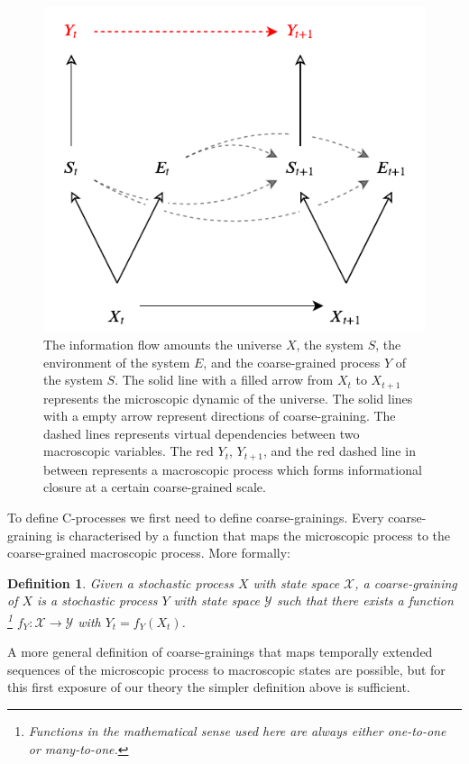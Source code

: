 \documentclass[utf8]{article}
\newtheorem{definition}{Definition}
\begin{document}
        
		\begin{figure}[H]
		    \centering
			\includegraphics[width=\textwidth]{WritingMaterials/Fig_FullGraph/FullGraph.pdf}
			\caption{The information flow amounts the universe $X$, the system $S$, the environment of the system $E$, and the coarse-grained process $Y$ of the system $S$. The solid line with a filled arrow from $X_t$ to $X_{t+1}$ represents the microscopic dynamic of the universe. The solid lines with a empty arrow represent directions of coarse-graining. The dashed lines represents virtual dependencies between  two macroscopic variables. The red $Y_t$, $Y_{t+1}$, and the red dashed line in between represents a macroscopic process which forms informational closure at a certain coarse-grained scale.}
			\label{fig:fullgraph}
	   	\end{figure}

	   	To define C-processes we first need to define coarse-grainings. Every coarse-graining is characterised by a function that maps the microscopic process to the coarse-grained macroscopic process. More formally: 
	   	
	   	\begin{definition}
	   	 Given a stochastic process $X$ with state space $\mathcal{X}$, a \emph{coarse-graining of $X$} is a stochastic process $Y$ with state space $\mathcal{Y}$ such that there exists a function \footnote{Functions in the mathematical sense used here are always either one-to-one or many-to-one.} $f_Y:\mathcal{X}\rightarrow \mathcal{Y}$ with $Y_t=f_Y(X_t)$.  
	   	\end{definition}
	   	A more general definition of coarse-grainings that maps temporally extended sequences of the microscopic process to macroscopic states are possible, but for this first exposure of our theory the simpler definition above is sufficient. 
	   	
\end{document}
